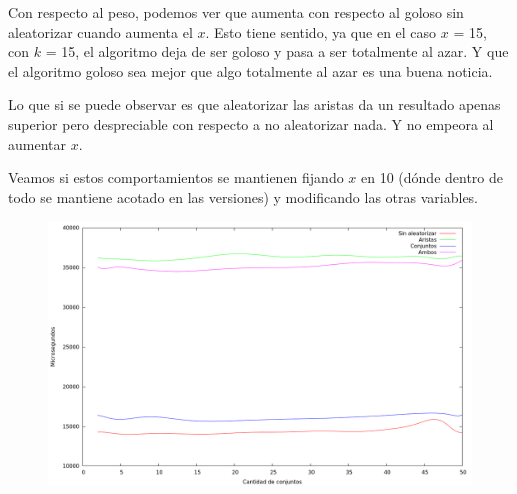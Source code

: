 \vspace*{0.5cm}

Con respecto al peso, podemos ver que aumenta con respecto al goloso sin
aleatorizar cuando aumenta el $x$. Esto tiene sentido, ya que en el caso
$x$ = 15, con $k$ = 15, el algoritmo deja de ser goloso y pasa a ser totalmente
al azar.
Y que el algoritmo goloso sea mejor que algo totalmente al azar es una buena
noticia.

Lo que si se puede observar es que aleatorizar las aristas da un resultado
apenas superior pero despreciable con respecto a no aleatorizar nada. Y no
empeora al aumentar $x$.

Veamos si estos comportamientos se mantienen fijando $x$ en 10 (dónde dentro
de todo se mantiene acotado en las versiones) y modificando las otras variables.

\vspace*{0.5cm}

\begin{figure}[H]
  \begin{center}
    \includegraphics[scale=0.35]{imagenes/grasp-goloso-k-tiempo.png}
  \end{center}
\end{figure}

\vspace*{0.5cm}

\vspace*{0.5cm}

